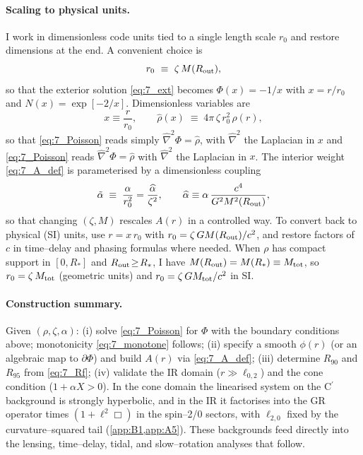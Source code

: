 \documentclass{iopjournal}
\begin{document}
\paragraph{Scaling to physical units.}
I work in dimensionless code units tied to a single length scale $r_0$ and restore dimensions at the end. A convenient choice is
\begin{equation}
r_0\ \equiv\ \zeta\,M(R_{\rm out}),
\label{eq:7_r0_def}
\end{equation}
so that the exterior solution \eqref{eq:7_ext} becomes $\Phi(x)=-1/x$ with $x=r/r_0$ and $N(x)=\exp[-2/x]$. Dimensionless variables are
\[
x\equiv \frac{r}{r_0},\qquad
\hat\rho(x)\;\equiv\;4\pi\,\zeta\,r_0^{2}\,\rho(r),
\]
so that \eqref{eq:7_Poisson} reads simply $\hat\nabla^{2}\Phi=\hat\rho$, with $\hat\nabla^{2}$ the Laplacian in $x$ and \eqref{eq:7_Poisson} reads $\hat\nabla^{2}\Phi=\hat\rho$ with $\hat\nabla^{2}$ the Laplacian in $x$. The interior weight \eqref{eq:7_A_def} is parameterised by a dimensionless coupling
\begin{equation}
\tilde\alpha\;\equiv\;\frac{\alpha}{r_0^{2}}=\frac{\widehat\alpha}{\zeta^{2}},
\qquad
\widehat\alpha\equiv \alpha\,\frac{c^{4}}{G^{2}M^{2}(R_{\rm out})},
\label{eq:7_alpha_tilde}
\end{equation}
so that changing $(\zeta,M)$ rescales $A(r)$ in a controlled way. To convert back to physical (SI) units, use $r= x\,r_0$ with $r_0=\zeta\,GM(R_{\rm out})/c^{2}$, and restore factors of $c$ in time–delay and phasing formulas where needed. When $\rho$ has compact support in $[0,R_\ast]$ and $R_{\rm out}\!\ge\!R_\ast$, I have $M(R_{\rm out})=M(R_\ast)\equiv M_{\rm tot}$, so $r_0=\zeta\,M_{\rm tot}$ (geometric units) and $r_0=\zeta\,GM_{\rm tot}/c^{2}$ in SI.


\paragraph{Construction summary.}
Given $(\rho,\zeta,\alpha)$: (i) solve \eqref{eq:7_Poisson} for $\Phi$ with the boundary conditions above; monotonicity \eqref{eq:7_monotone} follows; (ii) specify a smooth $\phi(r)$ (or an algebraic map to $\partial\Phi$) and build $A(r)$ via \eqref{eq:7_A_def}; (iii) determine $R_{90}$ and $R_{95}$ from \eqref{eq:7_Rf}; (iv) validate the IR domain ($r\gg \ell_{0,2}$) and the cone condition ($1+\alpha X>0$). In the cone domain the linearised system on the C$^\prime$ background is strongly hyperbolic, and in the IR it factorises into the GR operator times $(1+\ell^2\Box)$ in the spin–2/0 sectors, with $\ell_{2,0}$ fixed by the curvature–squared tail (\cref{app:B1,app:A5}). These backgrounds feed directly into the lensing, time–delay, tidal, and slow–rotation analyses that follow.
\end{document}

